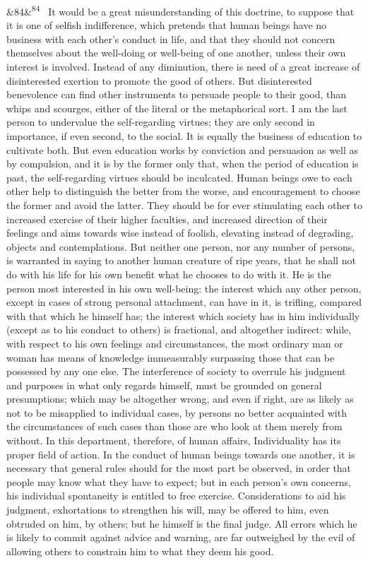 \documentclass[12pt]{article}
\newcommand{\para}[1][]{\par\noindent\ifx&#1&\else\textsuperscript{\footnotesize #1}~\fi}
\begin{document}
\para[84] It would be a great misunderstanding of this doctrine, to suppose that it is one of selfish indifference, which pretends that human beings have no business with each other's conduct in life, and that they should not concern themselves about the well-doing or well-being of one another, unless their own interest is involved. Instead of any diminution, there is need of a great increase of disinterested exertion to promote the good of others. But disinterested benevolence can find other instruments to persuade people to their good, than whips and scourges, either of the literal or the metaphorical sort. I am the last person to undervalue the self-regarding virtues; they are only second in importance, if even second, to the social. It is equally the business of education to cultivate both. But even education works by conviction and persuasion as well as by compulsion, and it is by the former only that, when the period of education is past, the self-regarding virtues should be inculcated. Human beings owe to each other help to distinguish the better from the worse, and encouragement to choose the former and avoid the latter. They should be for ever stimulating each other to increased exercise of their higher faculties, and increased direction of their feelings and aims towards wise instead of foolish, elevating instead of degrading, objects and contemplations. But neither one person, nor any number of persons, is warranted in saying to another human creature of ripe years, that he shall not do with his life for his own benefit what he chooses to do with it. He is the person most interested in his own well-being: the interest which any other person, except in cases of strong personal attachment, can have in it, is trifling, compared with that which he himself has; the interest which society has in him individually (except as to his conduct to others) is fractional, and altogether indirect: while, with respect to his own feelings and circumstances, the most ordinary man or woman has means of knowledge immeasurably surpassing those that can be possessed by any one else. The interference of society to overrule his judgment and purposes in what only regards himself, must be grounded on general presumptions; which may be altogether wrong, and even if right, are as likely as not to be misapplied to individual cases, by persons no better acquainted with the circumstances of such cases than those are who look at them merely from without. In this department, therefore, of human affairs, Individuality has its proper field of action. In the conduct of human beings towards one another, it is necessary that general rules should for the most part be observed, in order that people may know what they have to expect; but in each person's own concerns, his individual spontaneity is entitled to free exercise. Considerations to aid his judgment, exhortations to strengthen his will, may be offered to him, even obtruded on him, by others; but he himself is the final judge. All errors which he is likely to commit against advice and warning, are far outweighed by the evil of allowing others to constrain him to what they deem his good.
\end{document}
